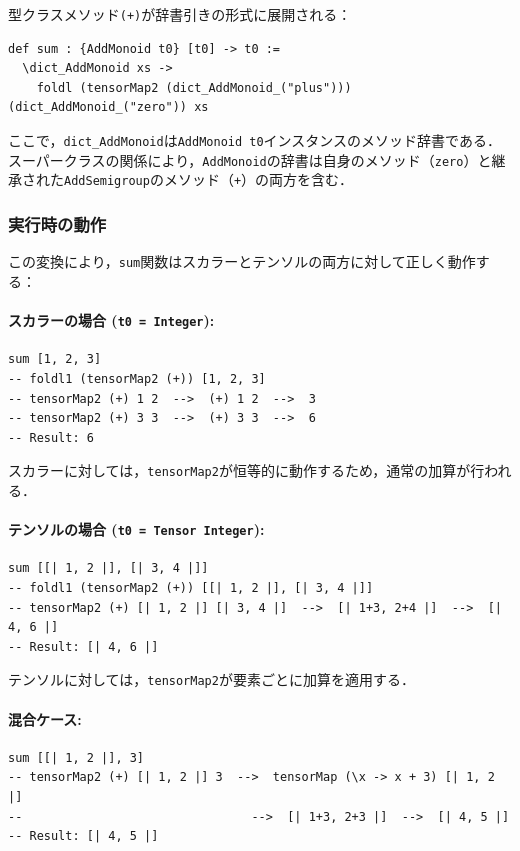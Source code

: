 型クラスメソッド\lstinline{(+)}が辞書引きの形式に展開される：

\begin{lstlisting}[language=egison,numbers=none]
def sum : {AddMonoid t0} [t0] -> t0 :=
  \dict_AddMonoid xs ->
    foldl (tensorMap2 (dict_AddMonoid_("plus"))) (dict_AddMonoid_("zero")) xs
\end{lstlisting}

ここで，\lstinline{dict_AddMonoid}は\lstinline{AddMonoid t0}インスタンスのメソッド辞書である．
スーパークラスの関係により，\lstinline{AddMonoid}の辞書は自身のメソッド（\lstinline{zero}）と継承された\lstinline{AddSemigroup}のメソッド（\lstinline{+}）の両方を含む．

\subsubsection{実行時の動作}

この変換により，\lstinline{sum}関数はスカラーとテンソルの両方に対して正しく動作する：

\paragraph{スカラーの場合 (\lstinline{t0 = Integer}):}
\begin{lstlisting}[language=egison,numbers=none]
sum [1, 2, 3]
-- foldl1 (tensorMap2 (+)) [1, 2, 3]
-- tensorMap2 (+) 1 2  -->  (+) 1 2  -->  3
-- tensorMap2 (+) 3 3  -->  (+) 3 3  -->  6
-- Result: 6
\end{lstlisting}

スカラーに対しては，\lstinline{tensorMap2}が恒等的に動作するため，通常の加算が行われる．

\paragraph{テンソルの場合 (\lstinline{t0 = Tensor Integer}):}
\begin{lstlisting}[language=egison,numbers=none]
sum [[| 1, 2 |], [| 3, 4 |]]
-- foldl1 (tensorMap2 (+)) [[| 1, 2 |], [| 3, 4 |]]
-- tensorMap2 (+) [| 1, 2 |] [| 3, 4 |]  -->  [| 1+3, 2+4 |]  -->  [| 4, 6 |]
-- Result: [| 4, 6 |]
\end{lstlisting}

テンソルに対しては，\lstinline{tensorMap2}が要素ごとに加算を適用する．

\paragraph{混合ケース:}
\begin{lstlisting}[language=egison,numbers=none]
sum [[| 1, 2 |], 3]
-- tensorMap2 (+) [| 1, 2 |] 3  -->  tensorMap (\x -> x + 3) [| 1, 2 |]
--                                -->  [| 1+3, 2+3 |]  -->  [| 4, 5 |]
-- Result: [| 4, 5 |]
\end{lstlisting}

